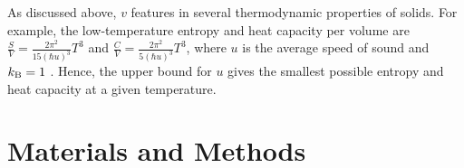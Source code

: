 \documentclass[aps,prl,groupedaddress,fleqn,twocolumn,10pt]{revtex4-1}
\begin{document}

As discussed above, $v$ features in several thermodynamic properties of solids. For example, the low-temperature entropy and heat capacity per volume are $\frac{S}{V}=\frac{2\pi^2}{15(\hbar u)^3}T^3$ and $\frac{C}{V}=\frac{2\pi^2}{5(\hbar u)^3}T^3$, where $u$ is the average speed of sound and $k_{\rm B}=1$ \cite{landau}. Hence, the upper bound for $u$ gives the smallest possible entropy and heat capacity at a given temperature.

\section{Materials and Methods}
\end{document}
